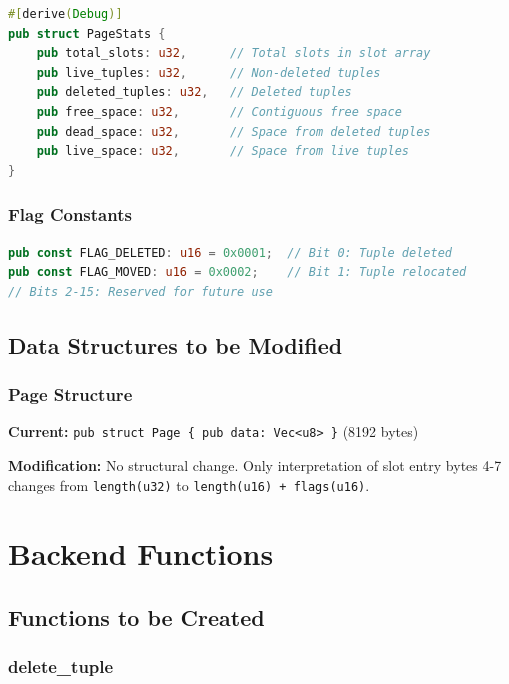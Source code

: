\documentclass[11pt,a4paper]{article}
\begin{document}
\begin{lstlisting}[language=Rust]
#[derive(Debug)]
pub struct PageStats {
    pub total_slots: u32,      // Total slots in slot array
    pub live_tuples: u32,      // Non-deleted tuples
    pub deleted_tuples: u32,   // Deleted tuples
    pub free_space: u32,       // Contiguous free space
    pub dead_space: u32,       // Space from deleted tuples
    pub live_space: u32,       // Space from live tuples
}
\end{lstlisting}

\subsubsection{Flag Constants}

\begin{lstlisting}[language=Rust]
pub const FLAG_DELETED: u16 = 0x0001;  // Bit 0: Tuple deleted
pub const FLAG_MOVED: u16 = 0x0002;    // Bit 1: Tuple relocated
// Bits 2-15: Reserved for future use
\end{lstlisting}

\subsection{Data Structures to be Modified}

\subsubsection{Page Structure}

\textbf{Current:} \texttt{pub struct Page \{ pub data: Vec<u8> \}} (8192 bytes)

\textbf{Modification:} No structural change. Only interpretation of slot entry bytes 4-7 changes from \texttt{length(u32)} to \texttt{length(u16) + flags(u16)}.

\section{Backend Functions}

\subsection{Functions to be Created}

\subsubsection{delete\_tuple}
\end{document}
